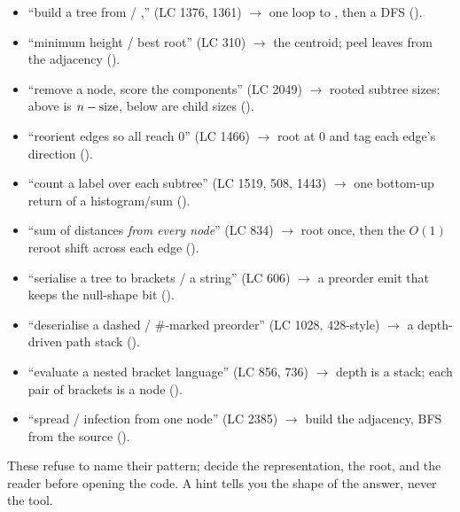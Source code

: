 \begin{itemize}[nosep, leftmargin=1.4em]
  \item ``build a tree from  / ,'' (LC 1376, 1361)
        $\longrightarrow$ one loop to , then a DFS ().
  \item ``minimum height / best root'' (LC 310) $\longrightarrow$ the centroid; peel leaves
        from the adjacency ().
  \item ``remove a node, score the components'' (LC 2049) $\longrightarrow$ rooted subtree
        sizes: above is $n-\operatorname{size}$, below are child sizes ().
  \item ``reorient edges so all reach 0'' (LC 1466) $\longrightarrow$ root at 0 and tag each
        edge's direction ().
  \item ``count a label over each subtree'' (LC 1519, 508, 1443) $\longrightarrow$ one
        bottom-up return of a histogram/sum ().
  \item ``sum of distances \emph{from every node}'' (LC 834) $\longrightarrow$ root once,
        then the $O(1)$ reroot shift across each edge ().
  \item ``serialise a tree to brackets / a string'' (LC 606) $\longrightarrow$ a preorder
        emit that keeps the null-shape bit ().
  \item ``deserialise a dashed / \#-marked preorder'' (LC 1028, 428-style) $\longrightarrow$
        a depth-driven path stack ().
  \item ``evaluate a nested bracket language'' (LC 856, 736) $\longrightarrow$ depth is a
        stack; each pair of brackets is a node ().
  \item ``spread / infection from one node'' (LC 2385) $\longrightarrow$ build the adjacency,
        BFS from the source ().
\end{itemize}


These refuse to name their pattern; decide the representation, the root, and the reader
before opening the code. A hint tells you the shape of the answer, never the tool.

